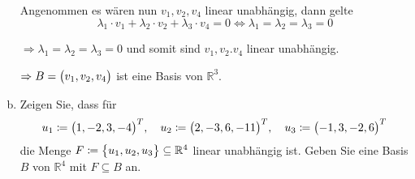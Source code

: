\documentclass{scrreprt}
\begin{document}
\begin{enumerate}[(a)]
  \newpage
  Angenommen es wären nun  $v_1, v_2, v_4$ linear unabhängig, dann gelte
  \[
    \lambda_1 \cdot v_1 + \lambda_2 \cdot v_2 + \lambda_3 \cdot v_4 = 0 \iff \lambda_1 = \lambda_2 = \lambda_3 = 0
  \]

  $\Rightarrow \lambda_1 = \lambda_2 = \lambda_3 = 0$ und somit sind
  $v_1, v_2. v_4$ linear unabhängig.

  $\Rightarrow B = \qty\big(v_1, v_2, v_4)$ ist eine Basis von $\mathbb{R}^3$.

\item Zeigen Sie, dass für
  \[
    u_1 \coloneqq \qty\big(1, -2, 3, -4)^T, \quad
    u_2 \coloneqq \qty\big(2, -3, 6, -11)^T, \quad
    u_3 \coloneqq \qty\big(-1, 3, -2, 6)^T
  \]
  die Menge $F \coloneqq \qty\big{u_1, u_2, u_3} \subseteq \mathbb{R}^4$ linear
  unabhängig ist.
  Geben Sie eine Basis $B$ von $\mathbb{R}^4$ mit $F \subseteq B$ an.


\end{enumerate}
\end{document}
